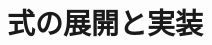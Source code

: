 \documentclass[uplatex,dvipdfmx,a4paper,11pt,oneside,openany]{jsbook}
\begin{document}

\section{式の展開と実装}
\end{document}

